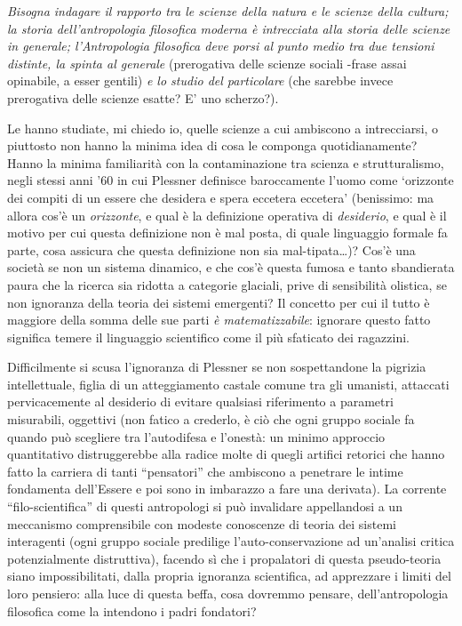 \documentclass[dvipsnames]{amsart}
\begin{document}
\emph{Bisogna indagare il rapporto tra le scienze della natura e le scienze della cultura; la storia dell'antropologia filosofica moderna è intrecciata alla storia delle scienze in generale; l'Antropologia filosofica deve porsi al punto medio tra due tensioni distinte, la spinta al generale} (prerogativa delle scienze sociali -frase assai opinabile, a esser gentili) \emph{e lo studio del particolare} (che sarebbe invece prerogativa delle scienze esatte? E' uno scherzo?).

Le hanno studiate, mi chiedo io, quelle scienze a cui ambiscono a intrecciarsi, o piuttosto non hanno la minima idea di cosa le componga quotidianamente? Hanno la minima familiarità con la contaminazione tra scienza e strutturalismo, negli stessi anni '60 in cui Plessner definisce baroccamente l'uomo come `orizzonte dei compiti di un essere che desidera e spera eccetera eccetera' (benissimo: ma allora cos'è un \emph{orizzonte}, e qual è la definizione operativa di \emph{desiderio}, e qual è il motivo per cui questa definizione non è mal posta, di quale linguaggio formale fa parte, cosa assicura che questa definizione non sia mal-tipata\dots)? Cos'è una società se non un sistema dinamico, e che cos'è questa fumosa e tanto sbandierata paura che la ricerca sia ridotta a categorie glaciali, prive di sensibilità olistica, se non ignoranza della teoria dei sistemi emergenti? Il concetto per cui il tutto è maggiore della somma delle sue parti \emph{è matematizzabile}: ignorare questo fatto significa temere il linguaggio scientifico come il più sfaticato dei ragazzini.

Difficilmente si scusa l'ignoranza di Plessner se non sospettandone la pigrizia intellettuale, figlia di un atteggiamento castale comune tra gli umanisti, attaccati pervicacemente al desiderio di evitare qualsiasi riferimento a parametri misurabili, oggettivi (non fatico a crederlo, è ciò che ogni gruppo sociale fa quando può scegliere tra l'autodifesa e l'onestà: un minimo approccio quantitativo distruggerebbe alla radice molte di quegli artifici retorici che hanno fatto la carriera di tanti ``pensatori'' che ambiscono a penetrare le intime fondamenta dell'Essere e poi sono in imbarazzo a fare una derivata). La corrente ``filo\hyp{}scientifica'' di questi antropologi si può invalidare appellandosi a un meccanismo comprensibile con modeste conoscenze di teoria dei sistemi interagenti (ogni gruppo sociale predilige l'auto\hyp{}conservazione ad un'analisi critica potenzialmente distruttiva), facendo sì che i propalatori di questa pseudo-teoria siano impossibilitati, dalla propria ignoranza scientifica, ad apprezzare i limiti del loro pensiero: alla luce di questa beffa, cosa dovremmo pensare, dell'antropologia filosofica come la intendono i padri fondatori?
\end{document}
